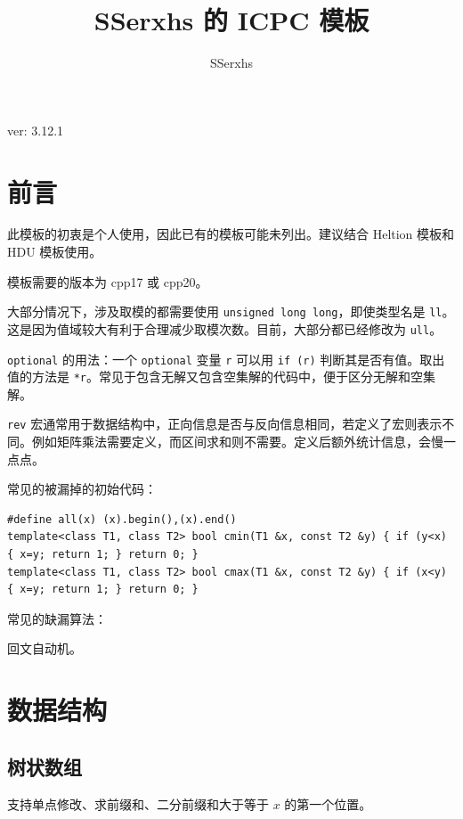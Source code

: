 \documentclass[12pt]{ctexart}
\author{SSerxhs}
\title{SSerxhs 的 ICPC 模板}
\begin{document}
\maketitle

\centerline{ver: 3.12.1}

\tableofcontents

\newpage

\section{前言}

此模板的初衷是个人使用，因此已有的模板可能未列出。建议结合 Heltion 模板和 HDU 模板使用。

模板需要的版本为 cpp17 或 cpp20。

大部分情况下，涉及取模的都需要使用 \verb|unsigned long long|，即使类型名是 \verb|ll|。这是因为值域较大有利于合理减少取模次数。目前，大部分都已经修改为 \verb|ull|。

\verb|optional| 的用法：一个 \verb|optional| 变量 \verb|r| 可以用 \verb|if (r)| 判断其是否有值。取出值的方法是 \verb|*r|。常见于包含无解又包含空集解的代码中，便于区分无解和空集解。

\verb|rev| 宏通常用于数据结构中，正向信息是否与反向信息相同，若定义了宏则表示不同。例如矩阵乘法需要定义，而区间求和则不需要。定义后额外统计信息，会慢一点点。

常见的被漏掉的初始代码：
\begin{lstlisting}
#define all(x) (x).begin(),(x).end()
template<class T1, class T2> bool cmin(T1 &x, const T2 &y) { if (y<x) { x=y; return 1; } return 0; }
template<class T1, class T2> bool cmax(T1 &x, const T2 &y) { if (x<y) { x=y; return 1; } return 0; }
\end{lstlisting}

常见的缺漏算法：

回文自动机。

\newpage

\section{数据结构}

\subsection{树状数组}

支持单点修改、求前缀和、二分前缀和大于等于 $x$ 的第一个位置。
\end{document}
